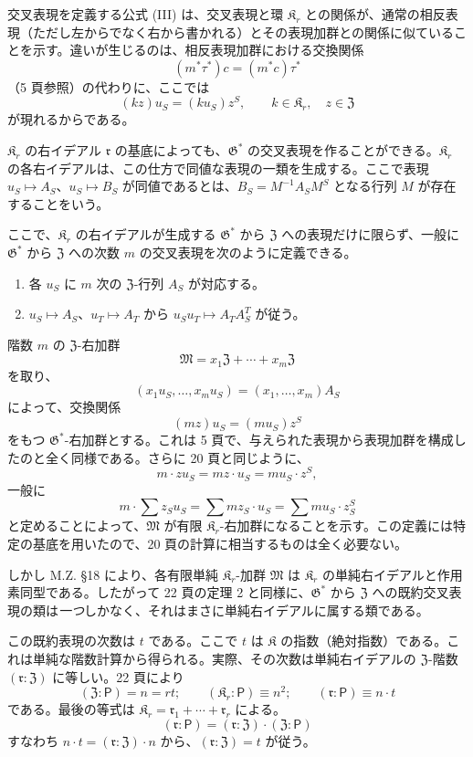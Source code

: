 交叉表現を定義する公式 (III) は、交叉表現と環 \(\mathfrak K_r\) との関係が、通常の相反表現（ただし左からでなく右から書かれる）とその表現加群との関係に似ていることを示す。違いが生じるのは、相反表現加群における交換関係
\[
(m^*\tau^*)c=(m^*c)\tau^*
\]
（5 頁参照）の代わりに、ここでは
\[
(kz)u_S=(ku_S)z^S,\qquad
k\in\mathfrak K_r,\quad z\in\mathfrak Z
\]
が現れるからである。

\(\mathfrak K_r\) の右イデアル \(\mathfrak r\) の基底によっても、\(\mathfrak G^*\) の交叉表現を作ることができる。\(\mathfrak K_r\) の各右イデアルは、この仕方で同値な表現の一類を生成する。ここで表現 \(u_S\mapsto A_S\)、\(u_S\mapsto B_S\) が同値であるとは、\(B_S=M^{-1}A_SM^S\) となる行列 \(M\) が存在することをいう。

ここで、\(\mathfrak K_r\) の右イデアルが生成する \(\mathfrak G^*\) から \(\mathfrak Z\) への表現だけに限らず、一般に \(\mathfrak G^*\) から \(\mathfrak Z\) への次数 \(m\) の交叉表現を次のように定義できる。
\begin{enumerate}
\item 各 \(u_S\) に \(m\) 次の \(\mathfrak Z\)-行列 \(A_S\) が対応する。
\item \(u_S\mapsto A_S\)、\(u_T\mapsto A_T\) から \(u_Su_T\mapsto A_TA_S^T\) が従う。
\end{enumerate}

階数 \(m\) の \(\mathfrak Z\)-右加群
\[
\mathfrak M=x_1\mathfrak Z+\cdots+x_m\mathfrak Z
\]
を取り、
\[
(x_1u_S,\ldots,x_mu_S)=(x_1,\ldots,x_m)A_S
\]
によって、交換関係
\[
(mz)u_S=(mu_S)z^S
\]
をもつ \(\mathfrak G^*\)-右加群とする。これは 5 頁で、与えられた表現から表現加群を構成したのと全く同様である。さらに 20 頁と同じように、
\[
m\cdot zu_S=mz\cdot u_S=mu_S\cdot z^S,
\]
一般に
\[
m\cdot\sum z_Su_S=\sum mz_S\cdot u_S
=\sum mu_S\cdot z_S^S
\]
と定めることによって、\(\mathfrak M\) が有限 \(\mathfrak K_r\)-右加群になることを示す。この定義には特定の基底を用いたので、20 頁の計算に相当するものは全く必要ない。

しかし M.Z. \S 18 により、各有限単純 \(\mathfrak K_r\)-加群 \(\mathfrak M\) は \(\mathfrak K_r\) の単純右イデアルと作用素同型である。したがって 22 頁の定理 2 と同様に、\(\mathfrak G^*\) から \(\mathfrak Z\) への既約交叉表現の類は\emph{一つ}しかなく、それはまさに単純右イデアルに属する類である。

この既約表現の次数は \(t\) である。ここで \(t\) は \(\mathfrak K\) の指数（絶対指数）である。これは単純な階数計算から得られる。実際、その次数は単純右イデアルの \(\mathfrak Z\)-階数 \((\mathfrak r:\mathfrak Z)\) に等しい。22 頁により
\[
(\mathfrak Z:\mathsf P)=n=rt;\qquad
(\mathfrak K_r:\mathsf P)\equiv n^2;\qquad
(\mathfrak r:\mathsf P)\equiv n\cdot t
\]
である。最後の等式は \(\mathfrak K_r=\mathfrak r_1+\cdots+\mathfrak r_r\) による。
\[
(\mathfrak r:\mathsf P)
=(\mathfrak r:\mathfrak Z)\cdot(\mathfrak Z:\mathsf P)
\]
すなわち \(n\cdot t=(\mathfrak r:\mathfrak Z)\cdot n\) から、\((\mathfrak r:\mathfrak Z)=t\) が従う。

